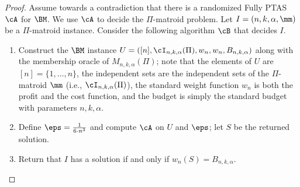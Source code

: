 \begin{proof}
	
	
	Assume towards a contradiction that there is a randomized Fully PTAS $\cA$ for $\BM$. We use $\cA$ to decide the $\Pi$-matroid problem.  Let $I = \left(n,k,\alpha,\mm\right)$ be a $\Pi$-matroid instance. Consider the following algorithm $\cB$ that decides $I$.
	\begin{enumerate}
		\item Construct the $\BM$ instance $%
		U= ([n],\cI_{n,k,\alpha}(\Pi),w_{n},w_{n},B_{n,k,\alpha})$ along with the membership oracle of $M_{n,k,\alpha}(\Pi)$; note that the elements of $U$ are $[n] = \{1,\ldots, n \}$, the independent sets are the independent sets of the $\Pi$-matroid $\mm$ (i.e., $\cI_{n,k,\alpha}(\Pi)$), the standard weight function $w_n$ is both the profit and the cost function, and the budget is simply the standard budget with parameters $n,k,\alpha$. %
		\item Define $\eps = \frac{1}{6 \cdot n^3}$ and compute $\cA$ on $U$ and $\eps$; let $S$ be the returned solution.  
		\item Return that $I$ has a solution if and only if $w_n(S) = B_{n,k,\alpha}$. 
	\end{enumerate}
	

\end{proof}
